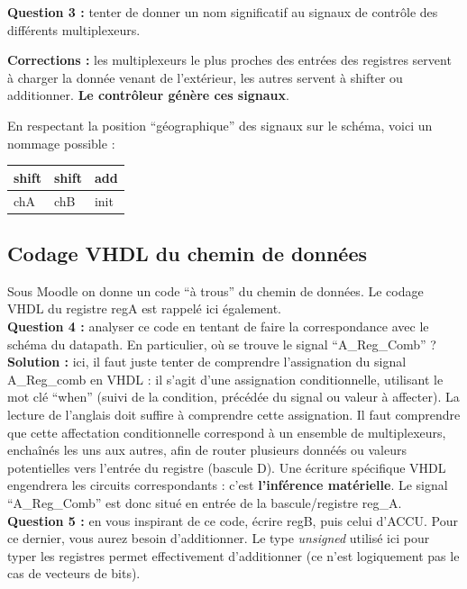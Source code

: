 \documentclass[a4paper,11pt]{article}
\begin{document}
{\bf Question 3 :} tenter de donner un nom significatif au signaux de contrôle des différents multiplexeurs.

{\bf Corrections :} les multiplexeurs le plus proches des entrées des registres servent à charger la donnée venant de l'extérieur, les autres servent à shifter ou additionner. {\bf Le contrôleur génère ces signaux}.

En respectant la position ``géographique'' des signaux sur le schéma, voici un nommage possible :

\begin{table}
    \begin{tabular}{|l|l|l|}
        \hline
        shift & shift & add  \\ \hline
        chA   & chB   & init \\
        \hline
    \end{tabular}
\end{table}

\subsection{Codage VHDL du chemin de données}


Sous Moodle on donne un code ``à trous'' du chemin de données. Le codage VHDL du registre regA est rappelé ici également.\\

{\bf Question 4 :} analyser ce code en tentant de faire la correspondance avec le schéma du datapath. En particulier, où se trouve le signal ``A\_Reg\_Comb'' ?\\

{\bf Solution :} ici, il faut juste tenter de comprendre l'assignation du signal  A\_Reg\_comb en VHDL : il s'agit d'une assignation conditionnelle, utilisant le mot clé ``when'' (suivi de la condition, précédée du signal ou valeur à affecter). La lecture de l'anglais doit suffire à comprendre cette assignation. Il faut comprendre que cette affectation conditionnelle correspond à un ensemble de multiplexeurs, enchaînés les uns aux autres, afin de router plusieurs donnéés ou valeurs potentielles vers l'entrée du registre (bascule D). Une écriture spécifique VHDL engendrera les circuits correspondants : c'est {\bf l'inférence matérielle}. Le signal ``A\_Reg\_Comb'' est donc situé en entrée de la bascule/registre reg\_A.\\

{\bf Question 5 :} en vous inspirant de ce code, écrire regB, puis celui d'ACCU. Pour ce dernier, vous aurez besoin d'additionner. Le type {\it unsigned} utilisé ici pour typer les registres permet effectivement d'additionner (ce n'est logiquement pas le cas de vecteurs de bits).\\
\end{document}

